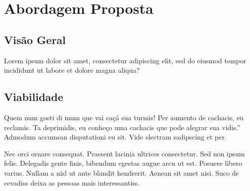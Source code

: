 %
%

\chapter{Abordagem Proposta}
\lipsum[1]

\section{Vis\~{a}o Geral}
\lipsum[1-2]

\begin{qpesq}
Lorem ipsum dolor sit amet, consectetur adipiscing elit, sed do eiusmod tempor incididunt ut labore et dolore magna aliqua?
\end{qpesq}

\section{Viabilidade}
Quem num gosti di mum que vai caçá sua turmis! Per aumento de cachacis, eu reclamis. Ta deprimidis, eu conheço uma cachacis que pode alegrar sua vidis.” Admodum accumsan disputationi eu sit. Vide electram sadipscing et per.

Nec orci ornare consequat. Praesent lacinia ultrices consectetur. Sed non ipsum felis. Delegadis gente finis, bibendum egestas augue arcu ut est. Posuere libero varius. Nullam a nisl ut ante blandit hendrerit. Aenean sit amet nisi. Suco de cevadiss deixa as pessoas mais interessantiss. 
